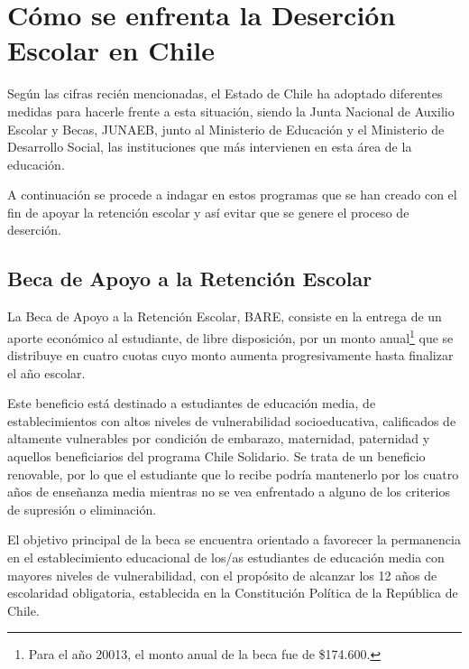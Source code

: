 \section{Cómo se enfrenta la Deserción Escolar en Chile}
Según las cifras recién mencionadas, el Estado de Chile ha adoptado diferentes medidas para hacerle frente a esta situación, siendo la Junta Nacional de Auxilio Escolar y Becas, JUNAEB, junto al Ministerio de Educación y el Ministerio de Desarrollo Social, las instituciones que más intervienen en esta área de la educación. 

A continuación se procede a indagar en estos programas que se han creado con el fin de apoyar la retención escolar y así evitar que se genere el proceso de deserción. 

\subsection{Beca de Apoyo a la Retención Escolar}
La Beca de Apoyo a la Retención Escolar, BARE, consiste en la entrega de un aporte económico al estudiante, de libre disposición, por un monto anual\footnote{Para el año 20013, el monto anual de la beca fue de \$174.600.} que se distribuye en cuatro cuotas cuyo monto aumenta progresivamente hasta finalizar el año escolar.

Este beneficio está destinado a estudiantes de educación media, de establecimientos con altos niveles de vulnerabilidad socioeducativa, calificados de altamente vulnerables por condición de embarazo, maternidad, paternidad y aquellos beneficiarios del programa Chile Solidario. Se trata de un beneficio renovable, por lo que el estudiante que lo recibe podría mantenerlo por los cuatro años de enseñanza media mientras no se vea enfrentado a alguno de los criterios de supresión o eliminación.

El objetivo principal de la beca se encuentra orientado a favorecer la permanencia en el establecimiento educacional de los/as estudiantes de educación media con mayores niveles de vulnerabilidad, con el propósito de alcanzar los 12 años de escolaridad obligatoria, establecida en la Constitución Política de la República de Chile.

